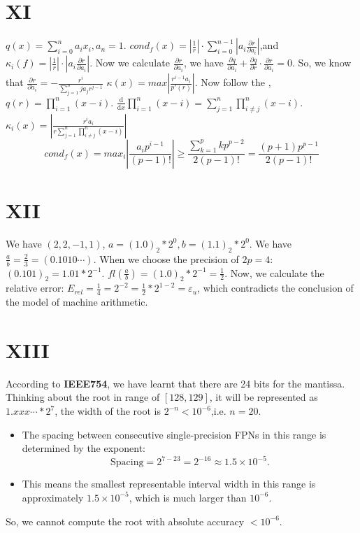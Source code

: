 \documentclass[a4paper]{article}
\begin{document}
\section*{XI}
$q(x) = \sum_{i=0}^{n} a_ix_i, a_n =1 $.
$cond_f(x) = |\frac{1}{r}|\cdot \sum_{i=0}^{n-1}|a_i\frac{\partial r}{\partial a_i}|$,and $\kappa_i(f)=|\frac{1}{r}|\cdot|a_i\frac{\partial r}{\partial a_i}|$.
Now we calculate $\frac{\partial r}{\partial a_i}$, we have $\frac{\partial q}{\partial a_i}+\frac{\partial q}{\partial r} \cdot \frac{\partial r}{\partial a_i} = 0$.
So, we know that $\frac{\partial r}{\partial a_i} = -\frac{r^i}{\sum_{j=1}^{n}ja_jr^{j-1}}$
$\kappa(x)= max |\frac{r^{i-1}a_i}{p'(r)}|$. Now follow the ,$q(r) = \prod_{i=1}^{n}(x-i)$. $\frac{\mathrm{d} }{\mathrm{d} x} \prod_{i=1}^{n}(x-i) = \sum_{j=1}^{n}\prod_{i\ne j}^{n} (x-i)$.
$\kappa_i(x) = |\frac{r^ia_i}{r\sum_{j=1}^{n}\prod_{i\ne j}^{n} (x-i)}|$
$$cond_f(x) = max_{i}|\frac{a_i p^{i-1}}{(p-1)!}|\geq \frac{\sum_{k=1}^{p}kp^{p-2}}{2(p-1)!} = \frac{(p+1)p^{p-1}}{2(p-1)!}$$

\section*{XII}
We have $(2,2,-1,1)$, $a = (1.0)_2*2^{0}, b =  (1.1)_2*2^{0}$. We have $\frac{a }{b}= \frac{2}{3} = (0.1010 \cdots)$.
When we choose the precision of $2p = 4$: $(0.101)_2 = 1.01*2^{-1}$. $fl(\frac{a}{b})= (1.0)_2*2^{-1} = \frac{1}{2}$.
Now, we calculate the relative error: $E_{rel} = \frac{1}{4} = 2^{-2} = \frac{1}{2}*2^{1-2}=\varepsilon_u$, which contradicts
the conclusion of the model of machine arithmetic.

\section*{XIII}
According to \textbf{IEEE754}, we have learnt that there are 24 bits for the mantissa.
Thinking about the root in range of $[128,129]$, it will be represented as $1.xxx\cdots*2^{7}$, the width of the root is $2^{-n}<10^{-6}$,i.e. $n = 20$. 
\begin{itemize}
    \item The spacing between consecutive single-precision FPNs in this range is determined by the exponent:
    \[
    \text{Spacing} = 2^{7 - 23} = 2^{-16} \approx 1.5 \times 10^{-5}.
    \]
    \item This means the smallest representable interval width in this range is approximately \(1.5 \times 10^{-5}\), which is much larger than \(10^{-6}\).
\end{itemize}
So, we cannot compute the root with absolute accuracy $< 10^{-6}$.
\end{document}
